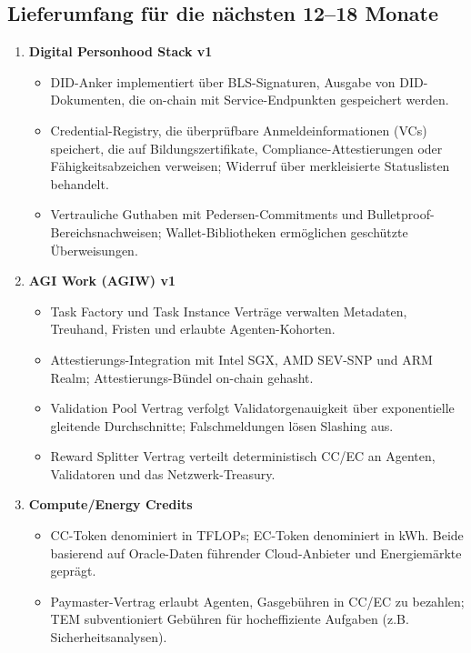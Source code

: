 \documentclass[11pt]{article}
\begin{document}
\subsection{Lieferumfang für die nächsten 12--18 Monate}
\begin{enumerate}[label=\textbf{D\arabic*.}, leftmargin=*]
  \item \textbf{Digital Personhood Stack v1}
  \begin{itemize}[noitemsep]
    \item DID-Anker implementiert über BLS-Signaturen, Ausgabe von DID-Dokumenten, die on-chain mit Service-Endpunkten gespeichert werden.
    \item Credential-Registry, die überprüfbare Anmeldeinformationen (VCs) speichert, die auf Bildungszertifikate, Compliance-Attestierungen oder Fähigkeitsabzeichen verweisen; Widerruf über merkleisierte Statuslisten behandelt.
    \item Vertrauliche Guthaben mit Pedersen-Commitments und Bulletproof-Bereichsnachweisen; Wallet-Bibliotheken ermöglichen geschützte Überweisungen.
  \end{itemize}
  \item \textbf{AGI Work (AGIW) v1}
  \begin{itemize}[noitemsep]
    \item Task Factory und Task Instance Verträge verwalten Metadaten, Treuhand, Fristen und erlaubte Agenten-Kohorten.
    \item Attestierungs-Integration mit Intel SGX, AMD SEV-SNP und ARM Realm; Attestierungs-Bündel on-chain gehasht.
    \item Validation Pool Vertrag verfolgt Validatorgenauigkeit über exponentielle gleitende Durchschnitte; Falschmeldungen lösen Slashing aus.
    \item Reward Splitter Vertrag verteilt deterministisch CC/EC an Agenten, Validatoren und das Netzwerk-Treasury.
  \end{itemize}
  \item \textbf{Compute/Energy Credits}
  \begin{itemize}[noitemsep]
    \item CC-Token denominiert in TFLOPs; EC-Token denominiert in kWh. Beide basierend auf Oracle-Daten führender Cloud-Anbieter und Energiemärkte geprägt.
    \item Paymaster-Vertrag erlaubt Agenten, Gasgebühren in CC/EC zu bezahlen; TEM subventioniert Gebühren für hocheffiziente Aufgaben (z.B. Sicherheitsanalysen).
  \end{itemize}

\end{enumerate}
\end{document}
